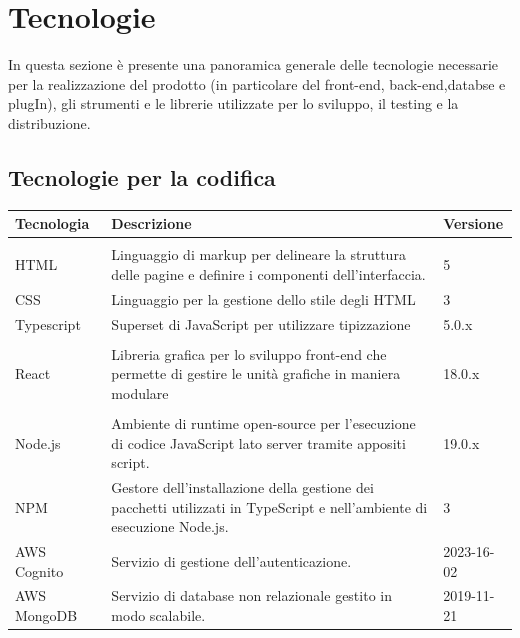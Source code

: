 \documentclass{article}
\begin{document}
\section{Tecnologie}
In questa sezione è presente una panoramica generale delle tecnologie necessarie per la realizzazione del prodotto (in particolare del front-end, back-end,databse e plugIn), gli strumenti e le librerie utilizzate per lo sviluppo, il testing e la distribuzione.

\subsection{Tecnologie per la codifica}

\begin{center}
\begin{tabular}{|P{8em}|P{18em}|P{5em}|}
\hline
{}
Tecnologia & Descrizione & Versione \\
\hline
{}
 \\
\hline
{}
HTML & Linguaggio di markup per delineare la struttura delle pagine e definire i componenti dell'interfaccia. & 5 \\
\hline
{}
CSS & Linguaggio per la gestione dello stile degli HTML & 3 \\
\hline
{}
Typescript & Superset di JavaScript per utilizzare tipizzazione & 5.0.x \\
\hline
{}
 \\
\hline
{}
React & Libreria grafica per lo sviluppo front-end che permette di gestire le unità grafiche in maniera modulare& 18.0.x \\
\hline
{}
 \\
\hline
{}
Node.js & Ambiente di runtime open-source per l'esecuzione di codice JavaScript lato
server tramite appositi script. & 19.0.x \\
\hline
{}
NPM & Gestore dell'installazione della gestione dei pacchetti utilizzati in TypeScript e nell'ambiente di esecuzione Node.js. & 3 \\
\hline
{}
AWS Cognito & Servizio di gestione dell'autenticazione. & 2023-16-02\\
\hline
{}
AWS MongoDB & Servizio di database non relazionale gestito in modo scalabile. & 2019-11-21\\

\end{tabular}
\end{center}
\end{document}
